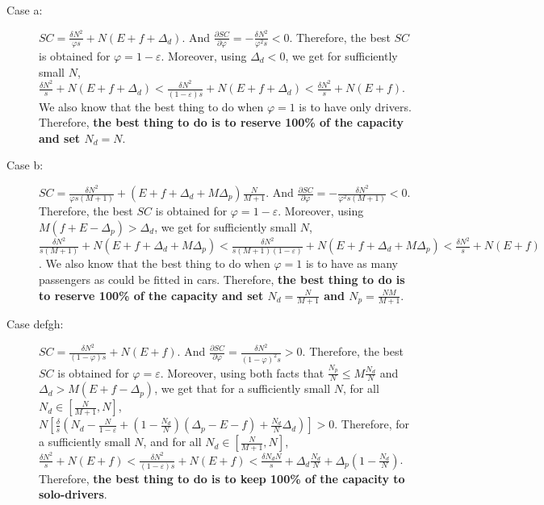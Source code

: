 \documentclass[english, a4paper]{article}
\theoremstyle{plain}
\theoremstyle{definition}
\theoremstyle{remark}
\begin{document}
        \begin{description}
            \item[Case a:] $SC = \frac{\delta N^2}{\varphi s} + N (E + f + \Delta_d)$. And $\frac{\partial SC}{\partial \varphi} = -\frac{\delta N^2}{\varphi ^2 s} < 0$. Therefore, the best $SC$ is obtained for $\varphi = 1- \varepsilon$. Moreover, using $\Delta_d < 0$, we get for sufficiently small $N$, $\frac{\delta N^2}{s} + N(E + f + \Delta_d) < \frac{\delta N^2}{(1 - \varepsilon)s} + N (E + f + \Delta_d) < \frac{\delta N^2}{s} + N(E+ f)$. We also know that the best thing to do when $\varphi = 1$ is to have only drivers. Therefore, \textbf{the best thing to do is to reserve 100\% of the capacity and set $N_d = N$}.

            \item[Case b:] $SC = \frac{\delta N^{2}}{\varphi s (M+1)} + (E + f + \Delta_d + M \Delta_p)\frac{N}{M+1}$. And $\frac{\partial SC}{\partial \varphi} = -\frac{\delta N^2}{\varphi ^2 s (M+1)} < 0$. Therefore, the best $SC$ is obtained for $\varphi = 1- \varepsilon$. Moreover, using $M(f+ E - \Delta_p) > \Delta_d$, we get for sufficiently small $N$, $\frac{\delta N^2}{s(M+1)} + N(E + f + \Delta_d + M\Delta _p) < \frac{\delta N^2}{s(M+1)(1 - \varepsilon)} + N(E + f + \Delta_d + M\Delta _p) < \frac{\delta N^2}{s} + N(E+ f)$. We also know that the best thing to do when $\varphi = 1$ is to have as many passengers as could be fitted in cars. Therefore, \textbf{the best thing to do is to reserve 100\% of the capacity and set $N_d = \frac{N}{M+1}$ and $N_p = \frac{NM}{M+1}$}.

            \item[Case defgh:] $SC = \frac{\delta N^2}{(1- \varphi)s} + N(E + f)$. And $\frac{\partial SC}{\partial \varphi} = \frac{\delta N^2}{(1 - \varphi) ^2 s} > 0$. Therefore, the best $SC$ is obtained for $\varphi = \varepsilon$. Moreover, using both facts that $\frac{N_p}{N} \leq M\frac{N_d}{N}$ and $\Delta_d > M(E + f -\Delta_p)$, we get that for a sufficiently small $N$, for all $N_d \in \left[ \frac{N}{M+1}, N\right]$, $N\left[ \frac{\delta}{s} \left( N_d - \frac{N}{1 - \varepsilon} + \left( 1 - \frac{N_d}{N} \right) (\Delta_p - E - f) + \frac{N_d}{N}\Delta_d \right) \right] > 0$. Therefore, for a sufficiently small $N$, and for all $N_d \in \left[ \frac{N}{M+1}, N\right]$, $\frac{\delta N^2}{s} + N(E + f) < \frac{\delta N^2}{(1 - \varepsilon)s} + N(E + f) < \frac{\delta N_d N}{s} + \Delta _d\frac{N_d}{N} + \Delta_p \left(1 - \frac{N_d}{N} \right)$. Therefore, \textbf{the best thing to do is to keep 100\% of the capacity to solo-drivers}.


\end{description}
\end{document}
